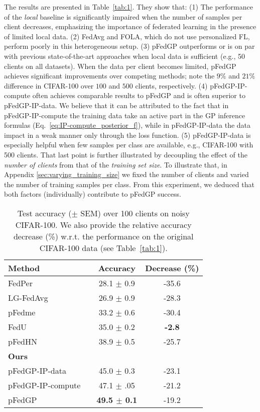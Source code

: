 \documentclass{article}
\def\Eqref#1{Eq.~\ref{#1}}
\newcommand{\tblref}[1]{Table~\ref{#1}}
\begin{document}
The results are presented in \tblref{tab:1}. They show that: (1) The performance of the \textit{local} baseline is significantly impaired when the number of samples per client decreases, emphasizing the importance of federated learning in the presence of limited local data. (2) FedAvg and FOLA, which do not use personalized FL, perform poorly in this heterogeneous setup. (3) pFedGP outperforms or is on par with previous state-of-the-art approaches when local data is sufficient (e.g., 50 clients on all datasets). When the data per client becomes limited, pFedGP achieves significant improvements over competing methods; note the $9\%$ and $21\%$ difference in CIFAR-100 over $100$ and $500$ clients, respectively. (4) pFedGP-IP-compute often achieves comparable results to pFedGP and is often superior to pFedGP-IP-data. We believe that it can be attributed to the fact that in pFedGP-IP-compute the training data take an active part in the GP inference formulas (\Eqref{eq:IP-compute_posterior_f}), while in pFedGP-IP-data the data impact in a weak manner only through the loss function. (5) pFedGP-IP-data is especially helpful when few samples per class are available, e.g., CIFAR-100 with 500 clients. That last point is further illustrated by decoupling the effect of the \textit{number of clients} from that of the \textit{training set size}. To illustrate that, in Appendix \ref{sec:varying_training_size} we fixed the number of clients and varied the number of training samples per class. From this experiment, we deduced that both factors (individually) contribute to pFedGP success.

\begin{wraptable}[16]{r}{0.5\linewidth}
\vspace{-13pt}
\setlength{\tabcolsep}{3pt}
\small
\caption{Test accuracy ($\pm$ SEM) over 100 clients on noisy CIFAR-100. We also provide the relative accuracy decrease (\%) w.r.t. the performance on the original CIFAR-100 data (see Table~\ref{tab:1}).
}
\centering
\begin{tabular}{l c c c} 
    \toprule
    \multicolumn{1}{l}{Method} && \multicolumn{1}{c}{Accuracy} & Decrease (\%) \\
    \midrule
    FedPer \cite{arivazhagan2019federated} && 28.1 $\pm$ 0.9 & -35.6 \\
    LG-FedAvg \cite{liang2020think} && 26.9 $\pm$ 0.9 & -28.3 \\
    pFedme \cite{t2020personalized} && 33.2 $\pm$ 0.6 & -30.4 \\
    FedU  \cite{dinh2021fedu} && 35.0 $\pm$ 0.2 & \textbf{-2.8} \\
    pFedHN \cite{shamsian2021personalized_icml} && 38.9 $\pm$ 0.5 & -25.7 \\
    \midrule
    \textbf{Ours} &&\\
    pFedGP-IP-data && 45.0 $\pm$ 0.3 & -23.1 \\
    pFedGP-IP-compute && 47.1 $\pm$ .05 & -21.2 \\
    pFedGP && \textbf{49.5 $\pm$ 0.1} & -19.2 \\
    \bottomrule
\end{tabular}
\label{tab:noisy_cifar}
\end{wraptable}
\end{document}
